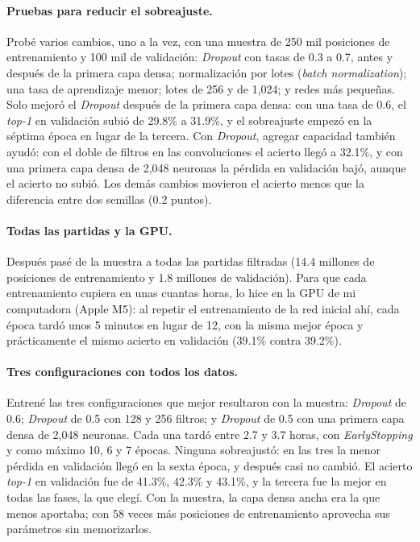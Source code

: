 \documentclass[a4paper,12pt,twocolumn]{article}
\begin{document}
\paragraph{Pruebas para reducir el sobreajuste.} Probé varios cambios, uno a la vez, con una muestra de 250 mil posiciones de entrenamiento y 100 mil de validación: \textit{Dropout} con tasas de 0.3 a 0.7, antes y después de la primera capa densa; normalización por lotes (\textit{batch normalization}); una tasa de aprendizaje menor; lotes de 256 y de 1,024; y redes más pequeñas. Solo mejoró el \textit{Dropout} después de la primera capa densa: con una tasa de 0.6, el \textit{top-1} en validación subió de 29.8\% a 31.9\%, y el sobreajuste empezó en la séptima época en lugar de la tercera. Con \textit{Dropout}, agregar capacidad también ayudó: con el doble de filtros en las convoluciones el acierto llegó a 32.1\%, y con una primera capa densa de 2,048 neuronas la pérdida en validación bajó, aunque el acierto no subió. Los demás cambios movieron el acierto menos que la diferencia entre dos semillas (0.2 puntos).

\paragraph{Todas las partidas y la GPU.} Después pasé de la muestra a todas las partidas filtradas (14.4 millones de posiciones de entrenamiento y 1.8 millones de validación). Para que cada entrenamiento cupiera en unas cuantas horas, lo hice en la GPU de mi computadora (Apple M5): al repetir el entrenamiento de la red inicial ahí, cada época tardó unos 5 minutos en lugar de 12, con la misma mejor época y prácticamente el mismo acierto en validación (39.1\% contra 39.2\%).

\paragraph{Tres configuraciones con todos los datos.} Entrené las tres configuraciones que mejor resultaron con la muestra: \textit{Dropout} de 0.6; \textit{Dropout} de 0.5 con 128 y 256 filtros; y \textit{Dropout} de 0.5 con una primera capa densa de 2,048 neuronas. Cada una tardó entre 2.7 y 3.7 horas, con \textit{EarlyStopping} y como máximo 10, 6 y 7 épocas. Ninguna sobreajustó: en las tres la menor pérdida en validación llegó en la sexta época, y después casi no cambió. El acierto \textit{top-1} en validación fue de 41.3\%, 42.3\% y 43.1\%, y la tercera fue la mejor en todas las fases, la que elegí. Con la muestra, la capa densa ancha era la que menos aportaba; con 58 veces más posiciones de entrenamiento aprovecha sus parámetros sin memorizarlos.
\end{document}
